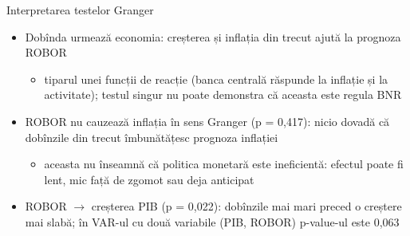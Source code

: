 \begin{frame}{Interpretarea testelor Granger}
\itemsize{\small}
\begin{itemize}
    \item Dobînda urmează economia: creșterea și inflația din trecut ajută la prognoza ROBOR
    \begin{itemize}
        \item tiparul unei funcții de reacție (banca centrală răspunde la inflație și la activitate); testul singur nu poate demonstra că aceasta este regula BNR
    \end{itemize}
    \item ROBOR nu cauzează inflația în sens Granger (p = 0{,}417): nicio dovadă că dobînzile din trecut îmbunătățesc prognoza inflației
    \begin{itemize}
        \item aceasta nu înseamnă că politica monetară este ineficientă: efectul poate fi lent, mic față de zgomot sau deja anticipat
    \end{itemize}
    \item ROBOR $\to$ creșterea PIB (p = 0{,}022): dobînzile mai mari preced o creștere mai slabă; în VAR-ul cu două variabile (PIB, ROBOR) p-value-ul este 0{,}063
\end{itemize}
\end{frame}

